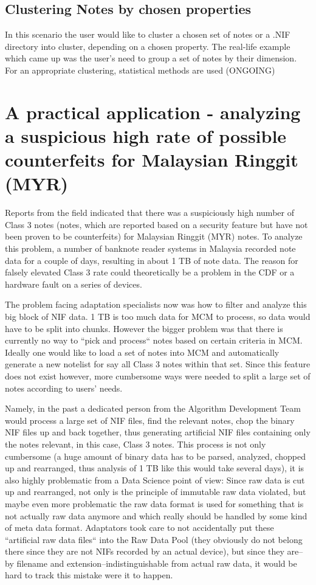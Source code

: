 \subsection{Clustering Notes by chosen properties}
In this scenario the user would like to cluster a chosen set of notes or a .NIF directory into cluster, depending on a chosen property. The real-life example which came up was the user's need to group a set of notes by their dimension. For an appropriate clustering, statistical methods are used (ONGOING)


\section{A practical application - analyzing a suspicious high rate of possible counterfeits for Malaysian Ringgit (MYR)}
Reports from the field indicated that there was a suspiciously high number of Class 3 notes (notes, which are reported based on a security feature but have not been proven to be counterfeits) for Malaysian Ringgit (MYR) notes. To analyze this problem, a number of banknote reader systems in Malaysia recorded note data for a couple of days, resulting in about 1 TB of note data. 
The reason for falsely elevated Class 3 rate could theoretically be a problem in the CDF or a hardware fault on a series of devices. \par
The problem facing adaptation specialists now was how to filter and analyze this big block of NIF data. 1 TB is too much data for MCM to process, so data would have to be split into chunks. However the bigger problem was that there is currently no way to ``pick and process`` notes based on certain criteria in MCM. Ideally one would like to load a set of notes into MCM and automatically generate a new notelist for say all Class 3 notes within that set. Since this feature does not exist however, more cumbersome ways were needed to split a large set of notes according to users' needs. \par 
Namely, in the past a dedicated person from the Algorithm Development Team would process a large set of NIF files, find the relevant notes, chop the binary NIF files up and back together, thus generating artificial NIF files containing only the notes relevant, in this case, Class 3 notes. This process is not only cumbersome (a huge amount of binary data has to be parsed, analyzed, chopped up and rearranged, thus analysis of 1 TB like this would take several days), it is also highly problematic from a Data Science point of view: Since raw data is cut up and rearranged, not only is the principle of immutable raw data violated, but maybe even more problematic the raw data format is used for something that is not actually raw data anymore and which really should be handled by some kind of meta data format. Adaptators took care to not accidentally put these ``artificial raw data files`` into the Raw Data Pool  (they obviously do not belong there since they are not NIFs recorded by an actual device), but since they are--by filename and extension--indistinguishable from actual raw data, it would be hard to track this mistake were it to happen. \par
